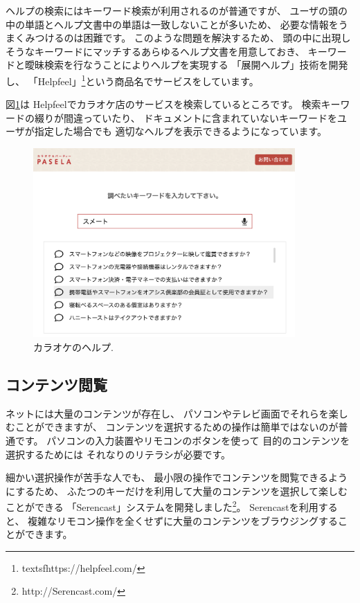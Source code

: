 \documentclass[topics]{compsoft} %
\begin{document}
ヘルプの検索にはキーワード検索が利用されるのが普通ですが、
ユーザの頭の中の単語とヘルプ文書中の単語は一致しないことが多いため、
必要な情報をうまくみつけるのは困難です\cite{10.1145/32206.32212}。
%
このような問題を解決するため、
頭の中に出現しそうなキーワードにマッチするあらゆるヘルプ文書を用意しておき、
キーワードと曖昧検索を行なうことによりヘルプを実現する
「展開ヘルプ」\cite{ExpandHelp}技術を開発し、
「Helpfeel」\footnote{
  textsf{https:{\slash}{\slash}helpfeel.com{\slash}}
}という商品名でサービスをしています。

図\ref{helpinquiry}は
Helpfeelでカラオケ店のサービスを検索しているところです。
検索キーワードの綴りが間違っていたり、
ドキュメントに含まれていないキーワードをユーザが指定した場合でも
適切なヘルプを表示できるようになっています。

\begin{figure}[t]
  \includegraphics[width=10cm,bb=0 0 1640 1188]{figures/4b2ca6d18537ec8d6922e0389324c3ea.png}
  \caption{カラオケのヘルプ.}
  \label{helpinquiry}
\end{figure}

\subsection{コンテンツ閲覧}

ネットには大量のコンテンツが存在し、
パソコンやテレビ画面でそれらを楽しむことができますが、
コンテンツを選択するための操作は簡単ではないのが普通です。
パソコンの入力装置やリモコンのボタンを使って
目的のコンテンツを選択するためには
それなりのリテラシが必要です。

細かい選択操作が苦手な人でも、
最小限の操作でコンテンツを閲覧できるようにするため、
ふたつのキーだけを利用して大量のコンテンツを選択して楽しむことができる
「Serencast」システムを開発しました\cite{Serencast}\footnote{
  \textsf{http:{\slash}{\slash}Serencast.com{\slash}}
}。
Serencastを利用すると、
複雑なリモコン操作を全くせずに大量のコンテンツをブラウジングすることができます。
\end{document}
